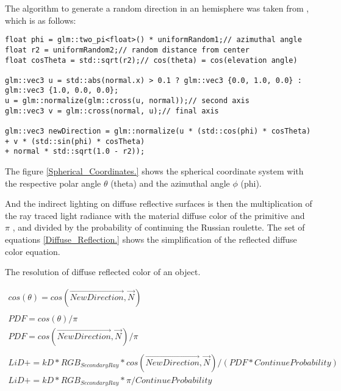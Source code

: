 \par
The algorithm to generate a random direction in an hemisphere was taken from  \cite{CosineSampleHemisphere}, which is as follows:

\begin{lstlisting}[caption={Method in Shader which generates a random direction in an hemisphere.}, captionpos=b, label=Shader]
float phi = glm::two_pi<float>() * uniformRandom1;// azimuthal angle
float r2 = uniformRandom2;// random distance from center
float cosTheta = std::sqrt(r2);// cos(theta) = cos(elevation angle)

glm::vec3 u = std::abs(normal.x) > 0.1 ? glm::vec3 {0.0, 1.0, 0.0} : glm::vec3 {1.0, 0.0, 0.0};
u = glm::normalize(glm::cross(u, normal));// second axis
glm::vec3 v = glm::cross(normal, u);// final axis

glm::vec3 newDirection = glm::normalize(u * (std::cos(phi) * cosTheta) + v * (std::sin(phi) * cosTheta)
+ normal * std::sqrt(1.0 - r2));
\end{lstlisting}

The figure \ref{Spherical_Coordinates.} shows the spherical coordinate system with the respective polar angle
$\theta$
(theta) and the azimuthal angle
$\phi$
(phi).

And the indirect lighting on diffuse reflective surfaces is then the multiplication of the ray traced light radiance with the material diffuse color of the primitive and
$\pi$
, and divided by the probability of continuing the Russian roulette.
The set of equations \ref{Diffuse_Reflection.} shows the simplification of the reflected diffuse color equation.

\begin{MyEquation}[H]
\caption{The resolution of diffuse reflected color of an object.}
\begin{equation}
\begin{gathered}
\label{Diffuse_Reflection.}
cos (\theta) = cos(\overrightarrow{NewDirection}, \overrightarrow{N})\\
\\
PDF = cos(\theta) / \pi\\
PDF = cos(\overrightarrow{NewDirection}, \overrightarrow{N}) / \pi\\
\\
LiD += kD * RGB_{SecondaryRay} * cos (\overrightarrow{NewDirection}, \overrightarrow{N}) / (PDF * ContinueProbability)\\
LiD += kD * RGB_{SecondaryRay} * \pi / ContinueProbability
\end{gathered}
\end{equation}
\end{MyEquation}

